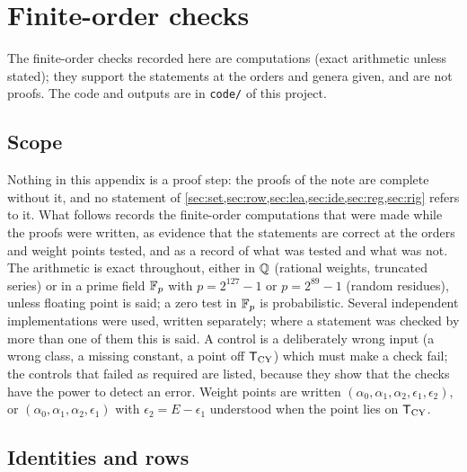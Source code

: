 \section{Finite-order checks}
\noindent{} The finite-order checks recorded here are computations (exact arithmetic unless stated); they support the statements at the orders and genera given, and are not proofs. The code and outputs are in \texttt{code/} of this project.

\label{sec:evi}

\subsection{Scope}
\label{sec:evi-scope}

Nothing in this appendix is a proof step: the proofs of the note are complete without it, and no statement of \cref{sec:set,sec:row,sec:lea,sec:ide,sec:reg,sec:rig} refers to it. What follows records the finite-order computations that were made while the proofs were written, as evidence that the statements are correct at the orders and weight points tested, and as a record of what was tested and what was not. The arithmetic is exact throughout, either in $\mathbb{Q}$ (rational weights, truncated series) or in a prime field $\mathbb{F}_p$ with $p=2^{127}-1$ or $p=2^{89}-1$ (random residues), unless floating point is said; a zero test in $\mathbb{F}_p$ is probabilistic. Several independent implementations were used, written separately; where a statement was checked by more than one of them this is said. A control is a deliberately wrong input (a wrong class, a missing constant, a point off $\mathsf{T}_{\mathrm{CY}}$) which must make a check fail; the controls that failed as required are listed, because they show that the checks have the power to detect an error. Weight points are written $(\alpha_0,\alpha_1,\alpha_2,\epsilon_1,\epsilon_2)$, or $(\alpha_0,\alpha_1,\alpha_2,\epsilon_1)$ with $\epsilon_2=E-\epsilon_1$ understood when the point lies on $\mathsf{T}_{\mathrm{CY}}$.

\subsection{Identities and rows}
\label{sec:evi-rows}

